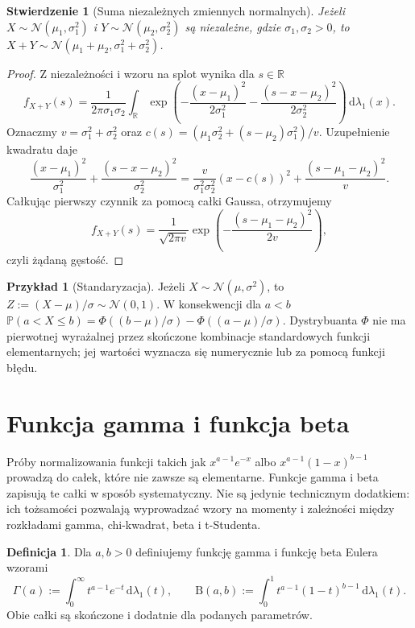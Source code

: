 \documentclass[11pt,a4paper,oneside]{report}
\numberwithin{equation}{chapter}
\theoremstyle{plain}
\newtheorem{stwierdzenie}[twierdzenie]{Stwierdzenie}
\theoremstyle{definition}
\newtheorem{definicja}{Definicja}[chapter]
\newtheorem{przyklad}{Przykład}[chapter]
\theoremstyle{remark}
\newcommand{\R}{\mathbb{R}}
\newcommand{\Prob}{\mathbb{P}}
\newcommand{\dd}{\mathrm{d}}
\newcommand{\Normal}{\mathcal{N}}
\begin{document}
\begin{stwierdzenie}[Suma niezależnych zmiennych normalnych]
Jeżeli $X\sim\Normal(\mu_1,\sigma_1^2)$ i
$Y\sim\Normal(\mu_2,\sigma_2^2)$ są niezależne,
gdzie $\sigma_1,\sigma_2>0$, to
$X+Y\sim\Normal(\mu_1+\mu_2,\sigma_1^2+\sigma_2^2)$.
\end{stwierdzenie}
\begin{proof}
Z niezależności i wzoru na splot wynika dla $s\in\R$
\[
f_{X+Y}(s)=\frac1{2\pi\sigma_1\sigma_2}
\int_\R\exp\!\left(-\frac{(x-\mu_1)^2}{2\sigma_1^2}
-\frac{(s-x-\mu_2)^2}{2\sigma_2^2}\right)\,\dd\lambda_1(x).
\]
Oznaczmy $v=\sigma_1^2+\sigma_2^2$ oraz
$c(s)=(\mu_1\sigma_2^2+(s-\mu_2)\sigma_1^2)/v$.
Uzupełnienie kwadratu daje
\[
\frac{(x-\mu_1)^2}{\sigma_1^2}
+\frac{(s-x-\mu_2)^2}{\sigma_2^2}
=\frac{v}{\sigma_1^2\sigma_2^2}(x-c(s))^2
+\frac{(s-\mu_1-\mu_2)^2}{v}.
\]
Całkując pierwszy czynnik za pomocą całki Gaussa, otrzymujemy
\[
f_{X+Y}(s)=\frac{1}{\sqrt{2\pi v}}
\exp\!\left(-\frac{(s-\mu_1-\mu_2)^2}{2v}\right),
\]
czyli żądaną gęstość.
\end{proof}

\begin{przyklad}[Standaryzacja]
Jeżeli $X\sim\Normal(\mu,\sigma^2)$, to
$Z:=(X-\mu)/\sigma\sim\Normal(0,1)$.
W konsekwencji dla $a<b$
$\Prob(a<X\leq b)=\Phi((b-\mu)/\sigma)-\Phi((a-\mu)/\sigma)$.
Dystrybuanta $\Phi$ nie ma pierwotnej wyrażalnej przez skończone
kombinacje standardowych funkcji elementarnych; jej wartości
wyznacza się numerycznie lub za pomocą funkcji błędu.
\end{przyklad}

\section{Funkcja gamma i funkcja beta}
Próby normalizowania funkcji takich jak
$x^{a-1}e^{-x}$ albo $x^{a-1}(1-x)^{b-1}$ prowadzą
do całek, które nie zawsze są elementarne. Funkcje gamma i beta
zapisują te całki w sposób systematyczny. Nie są jedynie
technicznym dodatkiem: ich tożsamości pozwalają wyprowadzać
wzory na momenty i zależności między rozkładami gamma,
chi-kwadrat, beta i t-Studenta.

\begin{definicja}
Dla $a,b>0$ definiujemy funkcję gamma i funkcję beta Eulera wzorami
\[
\Gamma(a):=\int_0^\infty t^{a-1}e^{-t}\,\dd\lambda_1(t),
\qquad
\mathrm B(a,b):=\int_0^1 t^{a-1}(1-t)^{b-1}\,\dd\lambda_1(t).
\]
Obie całki są skończone i dodatnie dla podanych parametrów.
\end{definicja}
\end{document}
